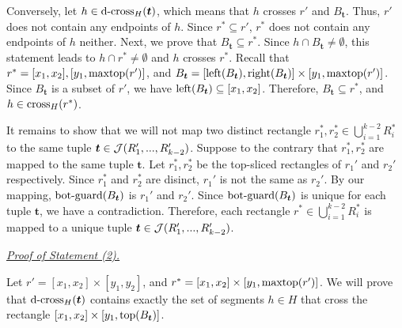 \vgap 

Conversely, let $h\in \mathrm{d\text{-}cross}_H(\textrm{\boldmath${t}$})$, which means that $h$ crosses $r'$ and $B_{\bm{t}}$. Thus, $r'$ does not contain any endpoints of $h$. Since $r^*\subseteq r'$, $r^*$ does not contain any endpoints of $h$ neither. 
Next, we prove that $B_{\bm{t}} \subseteq r^*$. Since $h \cap B_{\bm{t}}\neq \emptyset$, this statement leads to $h \cap r^* \neq \emptyset$ and $h$ crosses $r^*$. Recall that $r^* = [x_1,x_2], [y_1, \mathrm{maxtop}(r')]$, and $B_{\textrm{\boldmath${t}$}} = [\mathrm{left}(B_{\textrm{\boldmath${t}$}}), \mathrm{right}(B_{\textrm{\boldmath${t}$}})]\times [y_1,\mathrm{maxtop}(r')]$. Since $B_{\bm{t}}$ is a subset of $r'$, we have $\mathrm{left}(B_{\textrm{\boldmath${t}$}}) \subseteq [x_1,x_2]$. Therefore, $B_{\bm{t}} \subseteq r^*$, and $h\in \mathrm{cross}_H(r^*)$. 

\vgap 

It remains to show that we will not map two distinct rectangle $r_1^*, r_2^*\in \bigcup_{i = 1}^{k-2}R_i^*$ to the same tuple $\textrm{\boldmath${t}$}\in \mathcal{J}(R_1',...,R_{k-2}')$. Suppose to the contrary that $r_1^*, r_2^*$ are mapped to the same tuple $\bm{t}$. Let $r_1^*, r_2^*$ be the top-sliced rectangles of $r_1'$ and $r_2'$ respectively. Since $r_1^*$ and $r_2^*$ are disinct, $r_1'$ is not the same as $r_2'$. By our mapping, $\mathrm{bot\text{-}guard}(B_{\textrm{\boldmath${t}$}})$ is $r_1'$ and $r_2'$. Since $\mathrm{bot\text{-}guard}(B_{\textrm{\boldmath${t}$}})$ is unique for each tuple $\bm{t}$, we have a contradiction. Therefore, each rectangle $r^*\in \bigcup_{i = 1}^{k-2}R_i^*$ is mapped to a unique tuple $\textrm{\boldmath${t}$}\in \mathcal{J}(R_1',...,R_{k-2}')$.

\vgap
 
\noindent \underline{\em Proof of Statement (2).} 


Let $r' = [x_1,x_2]\times [y_1,y_2]$, and $r^* = [x_1,x_2] \times [y_1,\mathrm{maxtop}(r')]$. We will prove that $\mathrm{d\text{-}cross}_H(\textrm{\boldmath${t}$})$ contains exactly the set of segments $h\in H$ that cross the rectangle $[x_1,x_2]\times [y_1,\mathrm{top}(B_{\textrm{\boldmath${t}$}})]$.